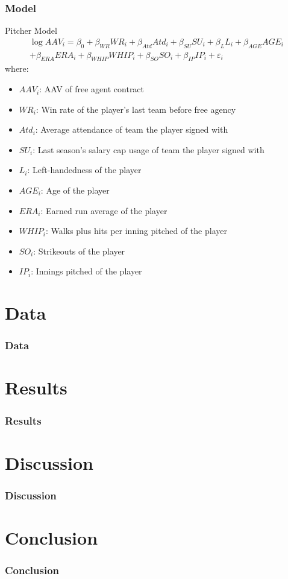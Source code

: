 \documentclass[9pt]{beamer}
\begin{document}
\begin{frame}
    \frametitle{Model}
    \begin{block}{Pitcher Model}
        \begin{multline}
            \log{AAV_{i}} = \beta_{0} 
                + \beta_{WR}WR_{i} 
                + \beta_{Atd}Atd_{i} 
                + \beta_{SU}SU_{i}
                + \beta_{L}L_{i} 
                + \beta_{AGE}AGE_{i} \\
                + \beta_{ERA}ERA_{i}
                + \beta_{WHIP}WHIP_{i}
                + \beta_{SO}SO_{i}
                + \beta_{IP}IP_{i}
                + \varepsilon_{i}
        \end{multline}
        where:
        \begin{itemize}
            \item $AAV_{i}$: AAV of free agent contract
            \item $WR_{i}$: Win rate of the player's last team before free agency
            \item $Atd_{i}$: Average attendance of team the player signed with
            \item $SU_{i}$: Last season's salary cap usage of team the player signed with
            \item $L_{i}$: Left-handedness of the player
            \item $AGE_{i}$: Age of the player
            \item $ERA_{i}$: Earned run average of the player
            \item $WHIP_{i}$: Walks plus hits per inning pitched of the player
            \item $SO_{i}$: Strikeouts of the player
            \item $IP_{i}$: Innings pitched of the player
        \end{itemize}
    \end{block}
\end{frame}

\section{Data}
\begin{frame}
    \frametitle{Data}
\end{frame}

\section{Results}
\begin{frame}
    \frametitle{Results}
\end{frame}

\section{Discussion}
\begin{frame}
    \frametitle{Discussion}
\end{frame}

\section{Conclusion}
\begin{frame}
    \frametitle{Conclusion}
\end{frame}
\end{document}
